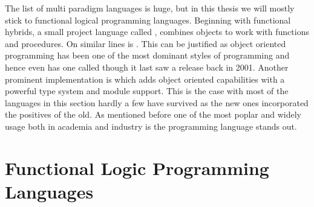 \documentclass[thesis-solanki.tex]{subfiles}
\begin{document}
The list of multi paradigm languages is huge, but in this thesis we will mostly stick to functional logical programming languages. Beginning with functional hybrids, a small project language called  \cite{website:virgil}, combines
objects to work with functions and procedures.
On similar lines is  \cite{website:closwiki}.
This can be justified as object oriented programming has been one of the most dominant styles of programming and
hence even  has one called  \cite{website:ohaskell} though it last saw a
release back in 2001.
Another prominent implementation is  \cite{website:ocamlwiki,website:ocamllang} which adds object
oriented capabilities with a powerful type system and module support.
This is the case with most of the languages in this section hardly a few have survived as the new ones incorporated
the positives of the old.
As mentioned before one of the most poplar \cite{website:langpop} and widely usage both in academia and industry is
the  \cite{website:scala} programming language stands out.


\section{Functional Logic Programming Languages}
\end{document}
